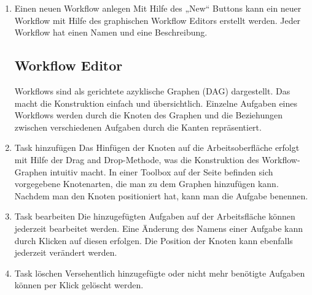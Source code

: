         \begin{enumerate}[font={\bfseries}, label={FA\arabic*}0, wide=0pt, labelindent=1em, leftmargin=*]
        
            \item \label{workflowAnlegen:1} Einen neuen Workflow anlegen\newline
            Mit Hilfe des „New“ Buttons kann ein neuer Workflow mit Hilfe des graphischen Workflow Editors erstellt werden. Jeder Workflow hat einen Namen und eine Beschreibung.
            
                \subsection{Workflow Editor}
                Workflows sind als gerichtete azyklische Graphen (DAG) dargestellt. Das macht die Konstruktion einfach und übersichtlich. Einzelne Aufgaben eines Workflows werden durch die Knoten des Graphen und die Beziehungen zwischen verschiedenen Aufgaben durch die Kanten repräsentiert.
            
            \item \label{taskHinzufuegen:1} Task hinzufügen \newline
            Das Hinfügen der Knoten auf die Arbeitsoberfläche erfolgt mit Hilfe der \Gls{Drag and Drop}-Methode, was die Konstruktion des Workflow-Graphen intuitiv macht. In einer Toolbox auf der Seite befinden sich vorgegebene Knotenarten, die man zu dem Graphen hinzufügen kann. Nachdem man den Knoten positioniert hat, kann man die Aufgabe benennen.
        
            \item  \label{taskBearbeiten:1} Task bearbeiten \newline
            Die hinzugefügten Aufgaben auf der Arbeitsfläche können jederzeit bearbeitet werden. Eine Änderung des Namens einer Aufgabe kann durch Klicken auf diesen erfolgen. Die Position der Knoten kann ebenfalls jederzeit verändert werden.
            
            \item \label{taskLoeschen:1} Task löschen \newline
            Versehentlich hinzugefügte oder nicht mehr benötigte Aufgaben können per Klick gelöscht werden.
            

\end{enumerate}
